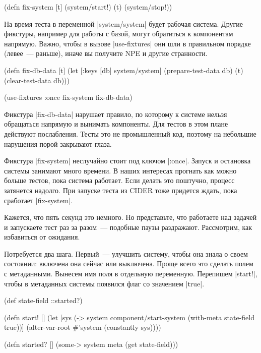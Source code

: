 \begin{english}
  \begin{clojure}
(defn fix-system [t]
  (system/start!)
  (t)
  (system/stop!))
  \end{clojure}
\end{english}

На время теста в переменной \spverb|system/system| будет рабочая система. Другие
фикстуры, например для работы с базой, могут обратиться к компонентам
напрямую. Важно, чтобы в вызове \spverb|use-fixtures| они шли в правильном
порядке (левее~--- раньше), иначе вы получите NPE и другие странности.

\begin{english}
  \begin{clojure}
(defn fix-db-data [t]
  (let [{:keys [db]} system/system]
    (prepare-test-data db)
    (t)
    (clear-test-data db)))

(use-fixtures :once fix-system fix-db-data)
  \end{clojure}
\end{english}

Фикстура \spverb|fix-db-data| нарушает правило, по которому к системе нельзя
обращаться напрямую и вынимать компоненты. Для тестов в этом плане действуют
послабления. Тесты это не промышленный код, поэтому на небольшие нарушения порой
закрывают глаза.

Фикстура \spverb|fix-system| неслучайно стоит под ключом \spverb|:once|. Запуск
и остановка системы занимают много времени. В наших интересах прогнать как можно
больше тестов, пока система работает. Если делать это поштучно, процесс
затянется надолго. При запуске теста из CIDER тоже придется ждать, пока
сработает \spverb|fix-system|.

Кажется, что пять секунд это немного. Но представьте, что работаете над задачей
и запускаете тест раз за разом~--- подобные паузы раздражают. Рассмотрим, как
избавиться от ожидания.

Потребуется два шага. Первый~--- улучшить систему, чтобы она знала о своем
состоянии: включена она сейчас или выключена. Проще всего это сделать полем с
метаданными. Вынесем имя поля в отдельную переменную. Перепишем \spverb|start!|,
чтобы в метаданных системы появился флаг со значением \spverb|true|.

\begin{english}
  \begin{clojure}
(def state-field ::started?)

(defn start! []
  (let [sys (-> system
                component/start-system
                (with-meta {state-field true}))]
    (alter-var-root #'system (constantly sys))))

(defn started? []
  (some-> system meta (get state-field)))
  \end{clojure}
\end{english}

